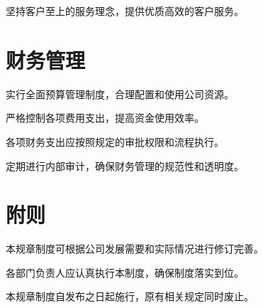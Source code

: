 \documentclass[UTF8]{ctexart}
\begin{document}
坚持客户至上的服务理念，提供优质高效的客户服务。

\section{财务管理}

实行全面预算管理制度，合理配置和使用公司资源。

严格控制各项费用支出，提高资金使用效率。

各项财务支出应按照规定的审批权限和流程执行。

定期进行内部审计，确保财务管理的规范性和透明度。

\section{附则}

本规章制度可根据公司发展需要和实际情况进行修订完善。

各部门负责人应认真执行本制度，确保制度落实到位。

本规章制度自发布之日起施行，原有相关规定同时废止。
\end{document}
